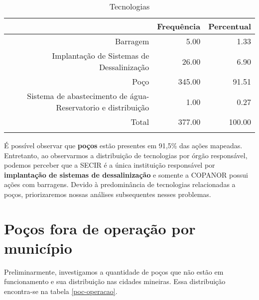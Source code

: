 \documentclass[a4paper, 12pt, openright, oneside, english, brazil, article]{abntex2}
\begin{document}
	\begin{scriptsize}
	\begin{longtable}{rrr}
		\caption{Tecnologias} \\ 
		\hline
		& Frequência & Percentual \\ 
		\hline
		Barragem & 5.00 & 1.33 \\ 
		Implantação de Sistemas de Dessalinização  & 26.00 & 6.90 \\ 
		Poço & 345.00 & 91.51 \\ 
		Sistema de abastecimento de água- Reservatorio e distribuição & 1.00 & 0.27 \\ 
		\hline
		Total & 377.00 & 100.00 \\ 
		\hline
		\hline
		\label{tectab}
	\end{longtable}
	\end{scriptsize}


	
	É possível observar que \textbf{poços} estão presentes em 91,5\% das ações mapeadas. Entretanto, ao observarmos a distribuição de tecnologias por órgão responsável, podemos perceber que a SECIR é a única instituição responsável por \textbf{implantação de sistemas de dessalinização} e somente a COPANOR possui ações com barragens. Devido à predominância de tecnologias relacionadas a poços, priorizaremos nossas análises subsequentes nesses problemas.

	\section{Poços fora de operação por município}
	
	Preliminarmente, investigamos a quantidade de poços que não estão em funcionamento e sua distribuição nas cidades mineiras. Essa distribuição encontra-se na tabela \ref{poc-operacao}.
	
\end{document}
